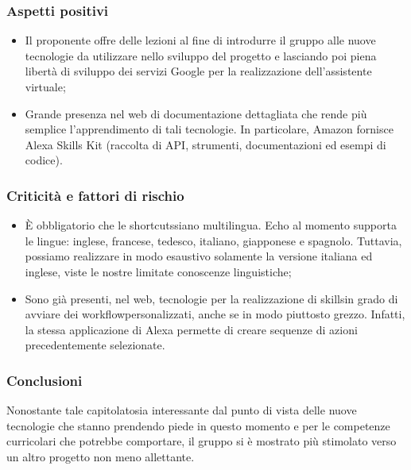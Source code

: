 \subsubsection{Aspetti positivi}
\begin{itemize}
	\item Il proponente offre delle lezioni al fine di introdurre il gruppo alle nuove tecnologie da utilizzare nello sviluppo del progetto e lasciando poi piena libertà di sviluppo dei servizi Google per la realizzazione dell’assistente virtuale;
	\item Grande presenza nel web di documentazione dettagliata che rende più semplice l’apprendimento di tali tecnologie. In particolare, Amazon fornisce Alexa Skills Kit (raccolta di API\glo, strumenti, documentazioni ed esempi di codice).
\end{itemize}
\subsubsection{Criticità e fattori di rischio}
\begin{itemize}
	\item È obbligatorio che le shortcuts\glosp siano multilingua. Echo al momento supporta le lingue: inglese, francese, tedesco, italiano, giapponese e spagnolo. Tuttavia, possiamo realizzare in modo esaustivo solamente la versione italiana ed inglese, viste le nostre limitate conoscenze linguistiche;
	\item Sono già presenti, nel web, tecnologie per la realizzazione di skills\glosp in grado di avviare dei workflow\glosp personalizzati, anche se in modo piuttosto grezzo. Infatti, la stessa applicazione di Alexa permette di creare sequenze di azioni precedentemente selezionate.
\end{itemize}
\subsubsection{Conclusioni}
Nonostante tale capitolato\glosp sia interessante dal punto di vista delle nuove tecnologie che stanno prendendo piede in questo momento e per le competenze curricolari che potrebbe comportare, il gruppo si è mostrato più stimolato verso un altro progetto non meno allettante.